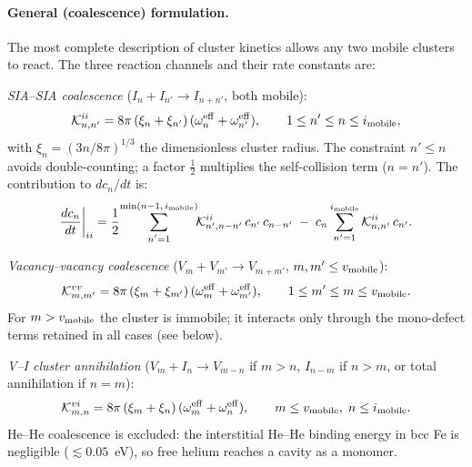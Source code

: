 \documentclass[pdflatex,sn-basic]{sn-jnl} %
\begin{document}
\paragraph{General (coalescence) formulation.}
The most complete description of cluster kinetics allows any two mobile
clusters to react. The three reaction channels and their rate constants
are:

\textit{SIA--SIA coalescence} ($I_n + I_{n'} \to I_{n+n'}$, both mobile):
\begin{equation}\label{eq:K_ii}
    \mathcal{K}_{n,n'}^{ii}
    = 8\pi\,(\xi_n + \xi_{n'})\,
      (\omega_n^{\mathrm{eff}} + \omega_{n'}^{\mathrm{eff}}),
    \qquad 1 \leq n' \leq n \leq i_{\rm mobile},
\end{equation}
with $\xi_n = (3n/8\pi)^{1/3}$ the dimensionless cluster radius. The
constraint $n' \leq n$ avoids double-counting; a factor $\tfrac{1}{2}$
multiplies the self-collision term ($n = n'$). The contribution to $dc_n/dt$
is:
\begin{equation}\label{eq:rate_ii}
    \frac{dc_n}{dt}\bigg|_{ii}
    = \frac{1}{2}\!\sum_{\substack{n'=1\\}}^{\min(n-1,\,i_{\rm mobile})}
      \!\!\mathcal{K}_{n',n-n'}^{ii}\,c_{n'}\,c_{n-n'}
    \;-\; c_n \sum_{n'=1}^{i_{\rm mobile}}
      \mathcal{K}_{n,n'}^{ii}\,c_{n'}.
\end{equation}

\textit{Vacancy--vacancy coalescence} ($V_m + V_{m'} \to V_{m+m'}$,
$m, m' \leq v_{\rm mobile}$):
\begin{equation}\label{eq:K_vv}
    \mathcal{K}_{m,m'}^{vv}
    = 8\pi\,(\xi_m + \xi_{m'})\,
      (\omega_m^{\mathrm{eff}} + \omega_{m'}^{\mathrm{eff}}),
    \qquad 1 \leq m' \leq m \leq v_{\rm mobile}.
\end{equation}
For $m > v_{\rm mobile}$ the cluster is immobile; it interacts only through the
mono-defect terms retained in all cases (see below).

\textit{V--I cluster annihilation} ($V_m + I_n \to V_{m-n}$ if $m > n$,
$I_{n-m}$ if $n > m$, or total annihilation if $n = m$):
\begin{equation}\label{eq:K_vi}
    \mathcal{K}_{m,n}^{vi}
    = 8\pi\,(\xi_m + \xi_n)\,
      (\omega_m^{\mathrm{eff}} + \omega_n^{\mathrm{eff}}),
    \qquad m \leq v_{\rm mobile},\; n \leq i_{\rm mobile}.
\end{equation}
He--He coalescence is excluded: the interstitial He--He binding energy in
bcc Fe is negligible ($\lesssim 0.05$~eV), so free helium reaches a cavity
as a monomer.
\end{document}
